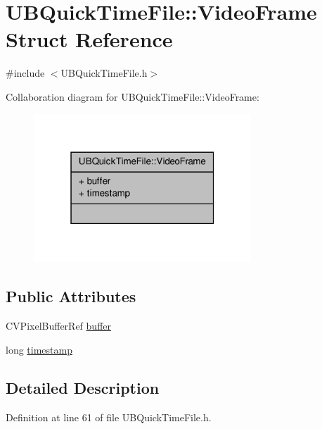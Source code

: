 \hypertarget{struct_u_b_quick_time_file_1_1_video_frame}{\section{U\-B\-Quick\-Time\-File\-:\-:Video\-Frame Struct Reference}
\label{da/df6/struct_u_b_quick_time_file_1_1_video_frame}
}


{\ttfamily \#include $<$U\-B\-Quick\-Time\-File.\-h$>$}



Collaboration diagram for U\-B\-Quick\-Time\-File\-:\-:Video\-Frame\-:
\nopagebreak
\begin{figure}[H]
\begin{center}
\leavevmode
\includegraphics[width=232pt]{d4/dc9/struct_u_b_quick_time_file_1_1_video_frame__coll__graph}
\end{center}
\end{figure}
\subsection*{Public Attributes}
\begin{DoxyCompactItemize}
\item 
C\-V\-Pixel\-Buffer\-Ref \hyperlink{struct_u_b_quick_time_file_1_1_video_frame_a9c80f2c63f511cf9162e762ca49a4115}{buffer}
\item 
long \hyperlink{struct_u_b_quick_time_file_1_1_video_frame_a91f04be8fde673cfe5922bb90784eae2}{timestamp}
\end{DoxyCompactItemize}


\subsection{Detailed Description}


Definition at line 61 of file U\-B\-Quick\-Time\-File.\-h.



